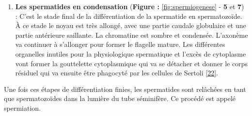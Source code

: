 \documentclass[12pt,twoside]{reedthesis}
\providecommand{\tightlist}{%
  \setlength{\itemsep}{0pt}\setlength{\parskip}{0pt}}
\theoremstyle{definition}
\theoremstyle{definition}
\theoremstyle{remark}
\begin{document}
  \newpage
  
  \begin{enumerate}
  \def\labelenumi{\arabic{enumi}.}
  \setcounter{enumi}{2}
  \tightlist
  \item
    \textbf{Les spermatides en condensation} (\textbf{Figure :
    }\ref{fig:spermiogenese} - \textbf{5} et \textbf{7}) : C'est le stade
    final de la différentiation de la spermatide en spermatozoïde. À ce
    stade le noyau est très allongé, avec une partie caudale globulaire et
    une partie antérieure saillante. La chromatine est sombre et
    condensée. L'axonème va continuer à s'allonger pour former le flagelle
    mature. Les différentes organelles inutiles pour la physiologique
    spermatique et l'excès de cytoplasme vont former la gouttelette
    cytoplasmique qui va se détacher et donner le corps résiduel qui va
    ensuite être phagocyté par les cellules de Sertoli
    {[}\protect\hyperlink{ref-Hermo2010}{22}{]}.
  \end{enumerate}
  
  Une fois ces étapes de différentiation finies, les spermatides sont
  relâchées en tant que spermatozoïdes dans la lumière du tube séminifère.
  Ce procédé est appelé spermiation.
  
\end{document}
